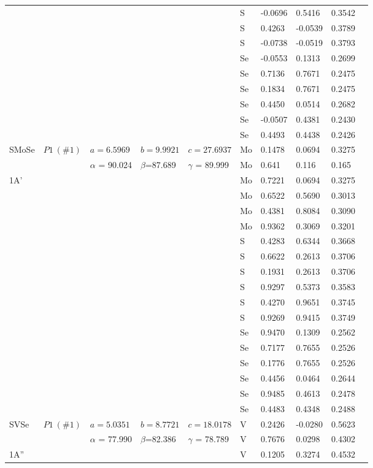 \documentclass[a4paperm]{article}
\begin{document}
\begin{longtable}[c]{l*{9}{l}}
	&&&&&	S	&	-0.0696	&	0.5416	&	0.3542	\\
	&&&&&	S	&	0.4263	&	-0.0539	&	0.3789	\\
	&&&&&	S	&	-0.0738	&	-0.0519	&	0.3793	\\
	&&&&&	Se	&	-0.0553	&	0.1313	&	0.2699	\\
	&&&&&	Se	&	0.7136	&	0.7671	&	0.2475	\\
	&&&&&	Se	&	0.1834	&	0.7671	&	0.2475	\\
	&&&&&	Se	&	0.4450	&	0.0514	&	0.2682	\\
	&&&&&	Se	&	-0.0507	&	0.4381	&	0.2430	\\
	&&&&&	Se	&	0.4493	&	0.4438	&	0.2426	\\
	\hline 
	SMoSe & $P1\ (\#1)$  &	$a=6.5969$ & $b=9.9921$ & $c=27.6937$  & Mo  &0.1478 &0.0694  &0.3275 \\
	&&$\alpha$ = 90.024& $\beta$=87.689& $\gamma$ = 89.999& Mo &0.641 &0.116 &0.165\\
	1A'&&&&&	Mo	&	0.7221	&	0.0694	&	0.3275	\\
	&&&&&	Mo	&	0.6522	&	0.5690	&	0.3013	\\
	&&&&&	Mo	&	0.4381	&	0.8084	&	0.3090	\\
	&&&&&	Mo	&	0.9362	&	0.3069	&	0.3201	\\
	&&&&&	S	&	0.4283	&	0.6344	&	0.3668	\\
	&&&&&	S	&	0.6622	&	0.2613	&	0.3706	\\
	&&&&&	S	&	0.1931	&	0.2613	&	0.3706	\\
	&&&&&	S	&	0.9297	&	0.5373	&	0.3583	\\
	&&&&&	S	&	0.4270	&	0.9651	&	0.3745	\\
	&&&&&	S	&	0.9269	&	0.9415	&	0.3749	\\
	&&&&&	Se	&	0.9470	&	0.1309	&	0.2562	\\
	&&&&&	Se	&	0.7177	&	0.7655	&	0.2526	\\
	&&&&&	Se	&	0.1776	&	0.7655	&	0.2526	\\
	&&&&&	Se	&	0.4456	&	0.0464	&	0.2644	\\
		&&&&&	Se	&	0.9485	&	0.4613	&	0.2478	\\
	&&&&&	Se	&	0.4483	&	0.4348	&	0.2488	\\
	\hline
	SVSe & $P1\ (\#1)$  &	$a=5.0351$ & $b=8.7721$ & $c=18.0178$  & V	&	0.2426	&	-0.0280	&	0.5623	\\
	&&$\alpha$ = 77.990& $\beta$=82.386& $\gamma$ = 78.789  & V	&	0.7676	&	0.0298	&	0.4302	\\		
	1A''&&&&&	V	&	0.1205	&	0.3274	&	0.4532	\\

\end{longtable}
\end{document}
